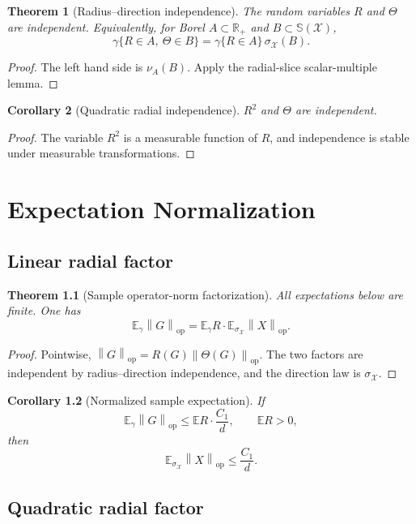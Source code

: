 \documentclass[11pt,oneside]{book}
\newtheorem{theorem}{Theorem}[chapter]
\newtheorem{corollary}[theorem]{Corollary}
\newcommand{\R}{\mathbb R}
\newcommand{\E}{\mathbb E}
\newcommand{\1}{\mathbf 1}
\newcommand{\Sphere}{\mathbb S}
\newcommand{\op}{\mathrm{op}}
\newcommand{\norm}[1]{\left\|#1\right\|}
\begin{document}
\begin{theorem}[Radius--direction independence]
The random variables \(R\) and \(\Theta\) are independent.  Equivalently, for
Borel \(A\subset\R_+\) and \(B\subset\Sphere(\mathcal X)\),
\[
  \gamma\{R\in A,\ \Theta\in B\}
  =
  \gamma\{R\in A\}\,\sigma_{\mathcal X}(B).
\]
\end{theorem}

\begin{proof}
The left hand side is \(\nu_A(B)\).  Apply the radial-slice scalar-multiple
lemma.
\end{proof}

\begin{corollary}[Quadratic radial independence]
\(R^2\) and \(\Theta\) are independent.
\end{corollary}

\begin{proof}
The variable \(R^2\) is a measurable function of \(R\), and independence is
stable under measurable transformations.
\end{proof}

\chapter{Expectation Normalization}

\section{Linear radial factor}

\begin{theorem}[Sample operator-norm factorization]
All expectations below are finite.  One has
\[
  \E_\gamma\norm G_{\op}
  =
  \E_\gamma R\cdot \E_{\sigma_{\mathcal X}}\norm X_{\op}.
\]
\end{theorem}

\begin{proof}
Pointwise, \(\norm G_{\op}=R(G)\norm{\Theta(G)}_{\op}\).  The two factors are
independent by radius--direction independence, and the direction law is
\(\sigma_{\mathcal X}\).
\end{proof}

\begin{corollary}[Normalized sample expectation]
If
\[
  \E_\gamma\norm G_{\op}\le \E R\cdot \frac{C_1}{d},
  \qquad \E R>0,
\]
then
\[
  \E_{\sigma_{\mathcal X}}\norm X_{\op}\le \frac{C_1}{d}.
\]
\end{corollary}

\section{Quadratic radial factor}
\end{document}
